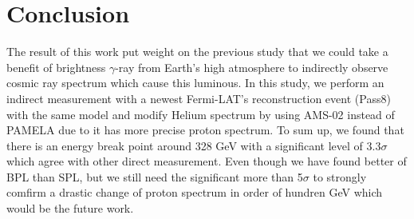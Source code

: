 \chapter{Conclusion}

The result of this work put weight on the previous study \cite{previouswork} that we could take a benefit of brightness $\gamma$-ray from Earth's high atmosphere to indirectly observe cosmic ray spectrum which cause this luminous. 
In this study, we perform an indirect measurement with a newest \acs{Fermi-LAT}'s reconstruction event (Pass8) with the same model and modify Helium spectrum by using AMS-02 instead of PAMELA due to it has more precise proton spectrum. To sum up, we found that there is an energy break point around 328 GeV with a significant level of 3.3$\sigma$ which agree with other direct measurement.
Even though we have found better of BPL than SPL, but we still need the significant more than 5$\sigma$ to strongly comfirm a drastic change of proton spectrum in order of hundren GeV which would be the future work.